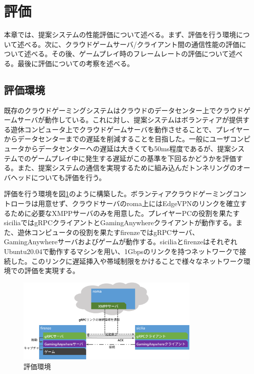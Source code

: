 \section{評価}
本章では、提案システムの性能評価について述べる。まず、評価を行う環境について述べる。次に、クラウドゲームサーバ/クライアント間の通信性能の評価について述べる。その後、ゲームプレイ時のフレームレートの評価について述べる。最後に評価についての考察を述べる。

\subsection{評価環境}
既存のクラウドゲーミングシステムはクラウドのデータセンター上でクラウドゲームサーバが動作している。これに対し、提案システムはボランティアが提供する遊休コンピュータ上でクラウドゲームサーバを動作させることで、プレイヤーからデータセンターまでの遅延を削減することを目指した。一般にユーザコンピュータからデータセンターへの遅延は大きくても50ms程度であるが、提案システムでのゲームプレイ中に発生する遅延がこの基準を下回るかどうかを評価する。また、提案システムの通信を実現するために組み込んだトンネリングのオーバヘッドについても評価を行う。

評価を行う環境を図\ref{fig:expenv}のように構築した。ボランティアクラウドゲーミングコントローラは用意せず、クラウドサーバのroma上にはEdgeVPNのリンクを確立するために必要なXMPPサーバのみを用意した。プレイヤーPCの役割を果たすsiciliaではgRPCクライアントとGamingAnywhereクライアントが動作する。また、遊休コンピュータの役割を果たすfirenzeではgRPCサーバ、GamingAnywhereサーバおよびゲームが動作する。siciliaとfirenzeはそれぞれUbuntu20.04で動作するマシンを用い、1Gbpsのリンクを持つネットワークで接続した。このリンクに遅延挿入や帯域制限をかけることで様々なネットワーク環境での評価を実現する。


\begin{figure}[t]
    \centering
    \includegraphics[width=0.8\textwidth,keepaspectratio,clip]{img/experimentalenvironment.eps}
    \caption{評価環境}
    \label{fig:expenv}
\end{figure}

